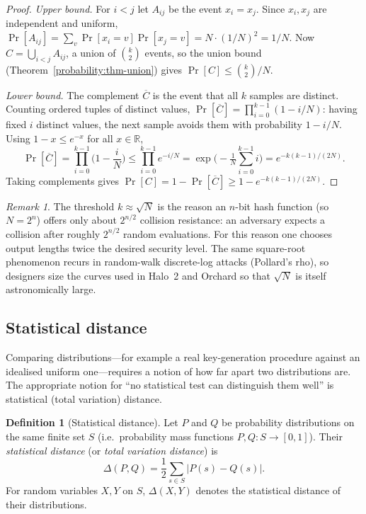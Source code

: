 \documentclass[11pt,a4paper]{article}
\theoremstyle{definition}
\newtheorem{definition}[theorem]{Definition}
\theoremstyle{remark}
\newtheorem{remark}[theorem]{Remark}
\newcommand{\R}{\ensuremath{\mathbb{R}}}
\begin{document}
\begin{proof}
\emph{Upper bound.} For \(i < j\) let \(A_{ij}\) be the event \(x_i = x_j\). Since \(x_i, x_j\) are independent and uniform, \(\Pr[A_{ij}] = \sum_{v} \Pr[x_i = v]\Pr[x_j = v] = N \cdot (1/N)^2 = 1/N\). Now \(C = \bigcup_{i<j} A_{ij}\), a union of \(\binom{k}{2}\) events, so the union bound (Theorem~\ref{probability:thm-union}) gives \(\Pr[C] \le \binom{k}{2}/N\).

\emph{Lower bound.} The complement \(\overline{C}\) is the event that all \(k\) samples are distinct. Counting ordered tuples of distinct values, \(\Pr[\overline{C}] = \prod_{i=0}^{k-1}(1 - i/N)\): having fixed \(i\) distinct values, the next sample avoids them with probability \(1 - i/N\). Using \(1 - x \le e^{-x}\) for all \(x \in \R\),
\[
\Pr[\overline{C}] = \prod_{i=0}^{k-1}\Big(1 - \frac iN\Big) \le \prod_{i=0}^{k-1} e^{-i/N} = \exp\!\Big(-\tfrac1N\sum_{i=0}^{k-1} i\Big) = e^{-k(k-1)/(2N)} .
\]
Taking complements gives \(\Pr[C] = 1 - \Pr[\overline C] \ge 1 - e^{-k(k-1)/(2N)}\).
\end{proof}

\begin{remark}\label{probability:rem-birthday}
The threshold \(k \approx \sqrt{N}\) is the reason an \(n\)-bit hash function (so \(N = 2^n\)) offers only about \(2^{n/2}\) collision resistance: an adversary expects a collision after roughly \(2^{n/2}\) random evaluations. For this reason one chooses output lengths twice the desired security level. The same square-root phenomenon recurs in random-walk discrete-log attacks (Pollard's rho), so designers size the curves used in Halo~2 and Orchard so that \(\sqrt{N}\) is itself astronomically large.
\end{remark}

\subsection{Statistical distance}

Comparing distributions---for example a real key-generation procedure against an idealised uniform one---requires a notion of how far apart two distributions are. The appropriate notion for ``no statistical test can distinguish them well'' is statistical (total variation) distance.

\begin{definition}[Statistical distance]\label{probability:def-sd}
Let \(P\) and \(Q\) be probability distributions on the same finite set \(S\) (i.e.\ probability mass functions \(P, Q\colon S \to [0,1]\)). Their \emph{statistical distance} (or \emph{total variation distance}) is
\[
\Delta(P, Q) = \frac12 \sum_{s \in S} \big|P(s) - Q(s)\big|.
\]
For random variables \(X, Y\) on \(S\), \(\Delta(X, Y)\) denotes the statistical distance of their distributions.
\end{definition}
\end{document}

